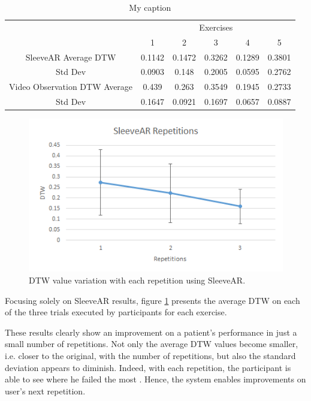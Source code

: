 \begin{table}
\centering
\begin{tabular}{c|c|c|c|c|c|}
\cline{2-6}
\multicolumn{1}{l|}{}                               & \multicolumn{5}{c|}{Exercises}             \\ \cline{2-6} 
                                                    & 1      & 2      & 3      & 4      & 5      \\ \hline
\multicolumn{1}{|c|}{SleeveAR Average DTW}          & 0.1142 & 0.1472 & 0.3262 & 0.1289 & 0.3801 \\ \hline
\multicolumn{1}{|c|}{Std Dev}                       & 0.0903 & 0.148  & 0.2005 & 0.0595 & 0.2762 \\ \hline
\multicolumn{1}{|c|}{Video Observation DTW Average} & 0.439  & 0.263  & 0.3549 & 0.1945 & 0.2733 \\ \hline
\multicolumn{1}{|c|}{Std Dev}                       & 0.1647 & 0.0921 & 0.1697 & 0.0657 & 0.0887 \\ \hline
\end{tabular}
\caption{My caption}
\label{table:dtwavg}
\end{table}

\begin{figure}[t!]
    \centering
    \includegraphics{imgs/results/dtw_repetitions.png}
    \caption{DTW value variation with each repetition using SleeveAR.}
    \label{fig:dtw_repetitions}
\end{figure}

Focusing solely on SleeveAR results, figure \ref{fig:dtw_repetitions} presents the average DTW on each of the three trials executed by participants for each exercise. 


These results clearly show an improvement on a patient's performance in just a small number of repetitions. 
Not only the average DTW values become smaller, i.e. closer to the original, with the number of repetitions, but also the standard deviation appears to diminish. 
Indeed, with each repetition, the participant is able to see where he failed the most . Hence,
the system enables improvements on user's next repetition.

